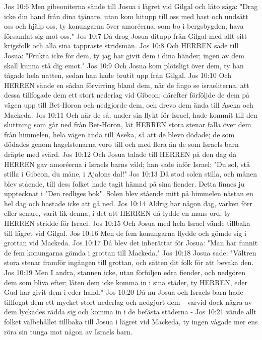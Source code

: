 Jos 10:6  Men gibeoniterna sände till Josua i lägret vid Gilgal och läto säga: "Drag icke din hand från dina tjänare, utan kom hitupp till oss med hast och undsätt oss och hjälp oss, ty konungarna över amoréerna, som bo i bergsbygden, hava församlat sig mot oss."
Jos 10:7  Då drog Josua ditupp från Gilgal med allt sitt krigsfolk och alla sina tappraste stridsmän.
Jos 10:8  Och HERREN sade till Josua: "Frukta icke för dem, ty jag har givit dem i dina händer; ingen av dem skall kunna stå dig emot."
Jos 10:9  Och Josua kom plötsligt över dem, ty han tågade hela natten, sedan han hade brutit upp från Gilgal.
Jos 10:10  Och HERREN sände en sådan förvirring bland dem, när de fingo se israeliterna, att dessa tillfogade dem ett stort nederlag vid Gibeon; därefter förföljde de dem på vägen upp till Bet-Horon och nedgjorde dem, och drevo dem ända till Aseka och Mackeda.
Jos 10:11  Och när de så, under sin flykt för Israel, hade kommit till den sluttning som går ned från Bet-Horon, lät HERREN stora stenar falla över dem från himmelen, hela vägen ända till Aseka, så att de blevo dödade; de som dödades genom hagelstenarna voro till och med flera än de som Israels barn dräpte med svärd.
Jos 10:12  Och Josua talade till HERREN på den dag då HERREN gav amoréerna i Israels barns våld; han sade inför Israel: "Du sol, stå stilla i Gibeon, du måne, i Ajalons dal!"
Jos 10:13  Då stod solen stilla, och månen blev stående, till dess folket hade tagit hämnd på sina fiender. Detta finnes ju upptecknat i "Den redliges bok". Solen blev stående mitt på himmelen nästan en hel dag och hastade icke att gå ned.
Jos 10:14  Aldrig har någon dag, varken förr eller senare, varit lik denna, i det att HERREN då lydde en mans ord; ty HERREN stridde för Israel.
Jos 10:15  Och Josua med hela Israel vände tillbaka till lägret vid Gilgal.
Jos 10:16  Men de fem konungarna flydde och gömde sig i grottan vid Mackeda.
Jos 10:17  Då blev det inberättat för Josua: "Man har funnit de fem konungarna gömda i grottan till Mackeda."
Jos 10:18  Josua sade: "Vältren stora stenar framför ingången till grottan, och sätten dit folk för att bevaka den.
Jos 10:19  Men I andra, stannen icke, utan förföljen edra fiender, och nedgören dem som bliva efter; låten dem icke komma in i sina städer, ty HERREN, eder Gud har givit dem i eder hand."
Jos 10:20  Då nu Josua och Israels barn hade tillfogat dem ett mycket stort nederlag och nedgjort dem - varvid dock några av dem lyckades rädda sig och komma in i de befästa städerna -
Jos 10:21  vände allt folket välbehållet tillbaka till Josua i lägret vid Mackeda, ty ingen vågade mer ens röra sin tunga mot någon av Israels barn.
